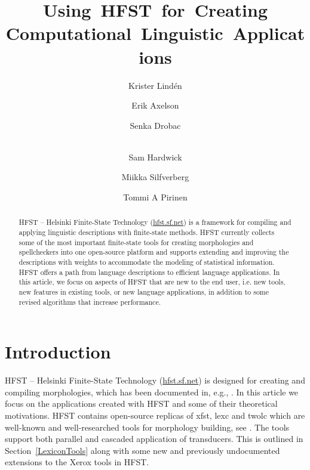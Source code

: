 \documentclass[draft]{llncs}
\begin{document}
%
\title{Using~HFST~for~Creating Computational~Linguistic~Applications}
%
\author{Krister Lind\'{e}n \and Erik Axelson \and Senka Drobac \and\\
  Sam Hardwick \and Miikka Silfverberg \and Tommi A Pirinen }


\maketitle

\begin{abstract}
  \sloppy HFST – Helsinki Finite-State Technology (\url{hfst.sf.net})
  is a framework for compiling and applying linguistic descriptions
  with finite-state methods. HFST currently collects some of the most 
  important finite-state tools for creating morphologies and spellcheckers into 
  one open-source platform and supports extending and improving 
  the descriptions with weights to accommodate the modeling of 
  statistical information. HFST offers a path from language descriptions 
  to efficient language applications. In this article, we focus 
  on aspects of HFST that are new to the end user, i.e. new tools, new features in
  existing tools, or new language applications, in addition to some revised algorithms 
  that increase performance.

\end{abstract}

\section{Introduction}

HFST – Helsinki Finite-State Technology (\url{hfst.sf.net}) is designed 
for creating and compiling morphologies, which has been documented in, e.g.,  
\cite{linden/2009/sfcm,linden/2011/sfcm}. In this article we focus on the applications 
created with HFST and some of their theoretical motivations. HFST
contains open-source replicas of xfst, lexc and twolc which are
well-known and well-researched tools for morphology building, see \cite{beesley/2003}. The tools
support both parallel and cascaded application of transducers. 
This is outlined in Section~\ref{LexiconTools} along with some new and 
previously undocumented extensions to the Xerox tools in HFST.  
\end{document}
